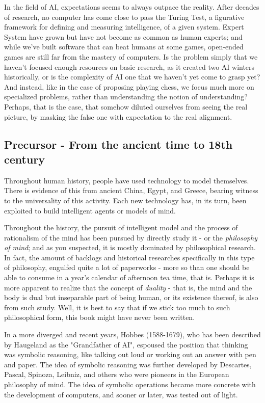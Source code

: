 In the field of AI, expectations seems to always outpace the reality. After decades of research, no computer has come close to pass the Turing Test, a figurative framework for defining and measuring intelligence, of a given system. Expert System have grown but have not become as common as human experts; and while we've built software that can beat humans at some games, open-ended games are still far from the mastery of computers. Is the problem simply that we haven't focused enough resources on basic research, as it created two AI winters historically, or is the complexity of AI one that we haven't yet come to grasp yet? And instead, like in the case of proposing playing chess, we focus much more on specialized problems, rather than understanding the notion of understanding? Perhaps, that is the case, that somehow diluted ourselves from seeing the real picture, by masking the false one with expectation to the real alignment. 

\subsection{Precursor - From the ancient time to 18th century}

Throughout human history, people have used technology to model themselves. There is evidence of this from ancient China, Egypt, and Greece, bearing witness to the universality of this activity. Each new technology has, in its turn, been exploited to build intelligent agents or models of mind. 

Throughout the history, the pursuit of intelligent model and the process of rationalism of the mind has been pursued by directly study it - or the \textit{philosophy of mind}; and as you suspected, it is mostly dominated by philosophical research. In fact, the amount of backlogs and historical researches specifically in this type of philosophy, engulfed quite a lot of paperworks - more so than one should be able to consume in a year's calendar of afternoon tea time, that is. Perhaps it is more apparent to realize that the concept of \textit{duality} - that is, the mind and the body is dual but inseparable part of being human, or its existence thereof, is also from such study. Well, it is best to say that if we stick too much to such philosophical form, this book might have never been written. 

In a more diverged and recent years, Hobbes (1588-1679), who has been described by Haugeland as the "Grandfather of AI", espoused the position that thinking was symbolic reasoning, like talking out loud or working out an answer with pen and paper. The idea of symbolic reasoning was further developed by Descartes, Pascal, Spinoza, Leibniz, and others who were pioneers in the European philosophy of mind. The idea of symbolic operations became more concrete with the development of computers, and sooner or later, was tested out of light. 

